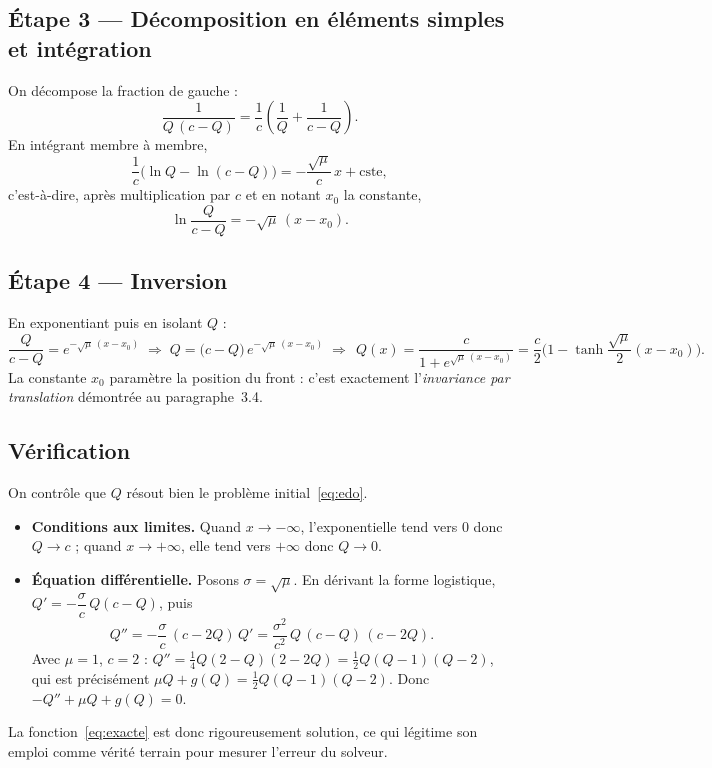 \documentclass[11pt,a4paper]{article}
\theoremstyle{plain}
\theoremstyle{remark}
\begin{document}
\subsection*{Étape 3 — Décomposition en éléments simples et intégration}
On décompose la fraction de gauche :
\[
  \frac{1}{Q\,(c-Q)}=\frac{1}{c}\left(\frac{1}{Q}+\frac{1}{c-Q}\right).
\]
En intégrant membre à membre,
\[
  \frac{1}{c}\Big(\ln Q-\ln(c-Q)\Big)
  =-\frac{\sqrt{\mu}}{c}\,x+\text{cste},
\]
c'est-à-dire, après multiplication par $c$ et en notant $x_0$ la constante,
\[
  \ln\!\frac{Q}{c-Q}=-\sqrt{\mu}\,(x-x_0).
\]

\subsection*{Étape 4 — Inversion}
En exponentiant puis en isolant $Q$ :
\[
  \frac{Q}{c-Q}=e^{-\sqrt{\mu}\,(x-x_0)}
  \;\Longrightarrow\;
  Q=\big(c-Q\big)\,e^{-\sqrt{\mu}\,(x-x_0)}
  \;\Longrightarrow\;
  \boxed{\,Q(x)=\frac{c}{1+e^{\sqrt{\mu}\,(x-x_0)}}
        =\frac{c}{2}\Big(1-\tanh\frac{\sqrt{\mu}}{2}(x-x_0)\Big).}
\]
La constante $x_0$ paramètre la position du front : c'est exactement
l'\emph{invariance par translation} démontrée au paragraphe~3.4.

\subsection*{Vérification}
On contrôle que $Q$ résout bien le problème initial~\eqref{eq:edo}.
\begin{itemize}[leftmargin=1.6em]
  \item \textbf{Conditions aux limites.} Quand $x\to-\infty$, l'exponentielle
  tend vers $0$ donc $Q\to c$ ; quand $x\to+\infty$, elle tend vers $+\infty$
  donc $Q\to0$. \checkmark
  \item \textbf{Équation différentielle.} Posons $\sigma=\sqrt{\mu}$. En dérivant
  la forme logistique, $Q'=-\dfrac{\sigma}{c}\,Q(c-Q)$, puis
  \[
    Q''=-\frac{\sigma}{c}\,(c-2Q)\,Q'
       =\frac{\sigma^2}{c^2}\,Q\,(c-Q)\,(c-2Q).
  \]
  Avec $\mu=1$, $c=2$ : $Q''=\tfrac14 Q(2-Q)(2-2Q)=\tfrac12 Q(Q-1)(Q-2)$, qui est
  précisément $\mu Q+g(Q)=\tfrac12 Q(Q-1)(Q-2)$. Donc $-Q''+\mu Q+g(Q)=0$.
  \checkmark
\end{itemize}
La fonction~\eqref{eq:exacte} est donc rigoureusement solution, ce qui légitime
son emploi comme vérité terrain pour mesurer l'erreur du solveur.
\end{document}
